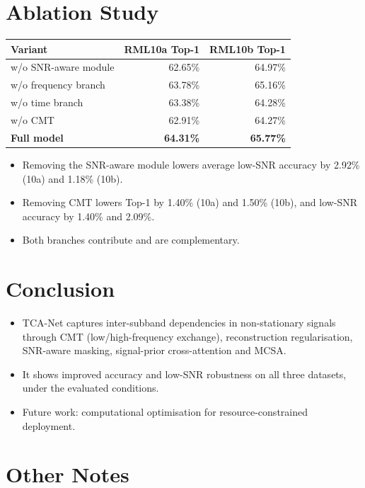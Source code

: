 \documentclass[11pt,a4paper]{article}
\begin{document}
\section{Ablation Study}

\begin{center}
\small
\begin{tabular}{lrr}
\toprule
Variant & RML10a Top-1 & RML10b Top-1 \\
\midrule
w/o SNR-aware module & 62.65\% & 64.97\% \\
w/o frequency branch & 63.78\% & 65.16\% \\
w/o time branch & 63.38\% & 64.28\% \\
w/o CMT & 62.91\% & 64.27\% \\
\textbf{Full model} & \textbf{64.31\%} & \textbf{65.77\%} \\
\bottomrule
\end{tabular}
\end{center}

\begin{itemize}
  \item Removing the SNR-aware module lowers average low-SNR accuracy by 2.92\% (10a) and 1.18\% (10b).
  \item Removing CMT lowers Top-1 by 1.40\% (10a) and 1.50\% (10b), and low-SNR accuracy by 1.40\% and 2.09\%.
  \item Both branches contribute and are complementary.
\end{itemize}

\section{Conclusion}

\begin{itemize}
  \item TCA-Net captures inter-subband dependencies in non-stationary signals through CMT (low/high-frequency exchange), reconstruction regularisation, SNR-aware masking, signal-prior cross-attention and MCSA.
  \item It shows improved accuracy and low-SNR robustness on all three datasets, under the evaluated conditions.
  \item Future work: computational optimisation for resource-constrained deployment.
\end{itemize}

\section{Other Notes}
\end{document}
